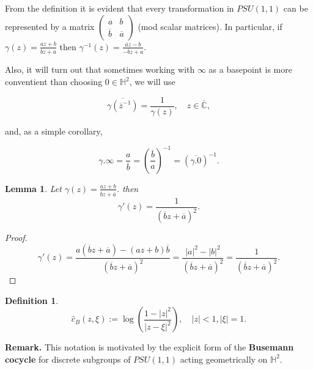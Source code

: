 \documentclass[11pt]{article}
\newtheorem{definition}{Definition}[section]
\newtheorem{lemma}{Lemma}[section]
\begin{document}
From the definition it is evident that every transformation in $PSU(1,1)$ can be represented by a matrix $\begin{pmatrix}
	a & b \\ \overline{b} & \overline{a}
\end{pmatrix}$ (mod scalar matrices). In particular, if $\gamma(z) = \frac{az + b}{\overline{b} z + \overline{a}}$ then $\gamma^{-1}(z) = \frac{\overline{a} z - b}{ -\overline{b}z + a}$.

Also, it will turn out that sometimes working with $\infty$ as a basepoint is more conventient than choosing $0 \in \mathbb{H}^2$, we will use

\begin{equation}
	\label{from inside to outside}
	\overline{\gamma\left( \overline{z}^{-1} \right)} = \frac{1}{\gamma(z)}, \quad z \in \overline{\mathbb{C}},
\end{equation}

and, as a simple corollary,

\begin{equation}
	\label{zero-infty}
	\gamma.\infty = \frac{a}{\overline{b}} = \left( \frac{\overline{b}}{a}\right)^{-1} = (\overline{\gamma.0})^{-1}.
\end{equation}

\begin{lemma}
	Let $\gamma(z) = \frac{az + b}{\overline{b} z + \overline{a}}$. then
	\[
	\gamma'(z) = \frac{1}{(\overline{b} z + \overline{a})^2}.
	\]
\end{lemma}

\begin{proof}
	\[
	\gamma'(z) = \frac{a ( \overline{b} z + \overline{a} ) - (az + b)\overline{b}}{(\overline{b} z + \overline{a})^2} = \frac{|a|^2 - |b|^2}{(\overline{b} z + \overline{a})^2} = \frac{1}{(\overline{b} z + \overline{a})^2}.
	\]
\end{proof}


\begin{definition}
	\begin{equation}
		\label{pseudo-Busemann cocycle}
		\hat{c}_B(z, \xi) := \log\left( \frac{1- |z|^2}{|z - \xi|^2} \right), \quad |z| < 1, |\xi| = 1.  
	\end{equation}
\end{definition}


\textbf{Remark.} This notation is motivated by the explicit form of the \textbf{Busemann cocycle} for discrete subgroups of $PSU(1,1)$ acting geometrically on $\mathbb{H}^2$.
\end{document}
